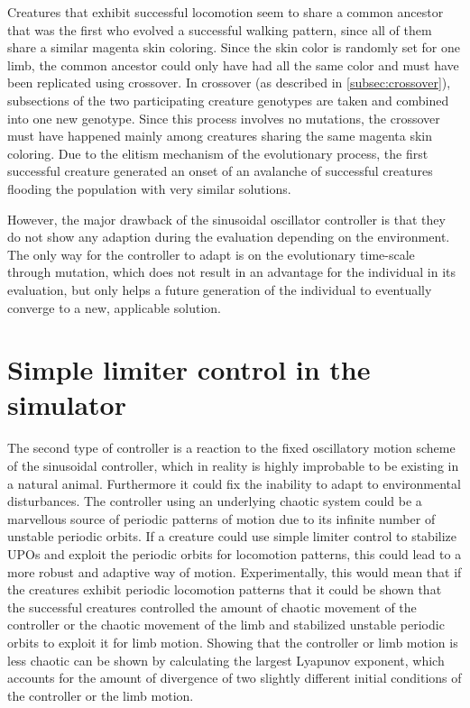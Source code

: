 \documentclass[main]{subfiles}
\begin{document}
Creatures that exhibit successful locomotion seem to share a common ancestor that was the first who evolved a successful walking pattern, since all of them share a similar magenta skin coloring. Since the skin color is randomly set for one limb, the common ancestor could only have had all the same color and must have been replicated using crossover. In crossover (as described in \ref{subsec:crossover}), subsections of the two participating creature genotypes are taken and combined into one new genotype. Since this process involves no mutations, the crossover must have happened mainly among creatures sharing the same magenta skin coloring. Due to the elitism mechanism of the evolutionary process, the first successful creature generated an onset of an avalanche of successful creatures flooding the population with very similar solutions. 

However, the major drawback of the sinusoidal oscillator controller is that they do not show any adaption during the evaluation depending on the environment. The only way for the controller to adapt is on the evolutionary time-scale through mutation, which does not result in an advantage for the individual in its evaluation, but only helps a future generation of the individual to eventually converge to a new, applicable solution.
\section{Simple limiter control in the simulator}

The second type of controller is a reaction to the fixed oscillatory motion scheme of the sinusoidal controller, which in reality is highly improbable to be existing in a natural animal. Furthermore it could fix the inability to adapt to environmental disturbances. The controller using an underlying chaotic system could be a marvellous source of periodic patterns of motion due to its infinite number of unstable periodic orbits. If a creature could use simple limiter control to stabilize UPOs and exploit the periodic orbits for locomotion patterns, this could lead to a more robust and adaptive way of motion. Experimentally, this would mean that if the creatures exhibit periodic locomotion patterns that it could be shown that the successful creatures controlled the amount of chaotic movement of the controller or the chaotic movement of the limb and stabilized unstable periodic orbits to exploit it for limb motion. Showing that the controller or limb motion is less chaotic can be shown by calculating the largest Lyapunov exponent, which accounts for the amount of divergence of two slightly different initial conditions of the controller or the limb motion.
\end{document}
